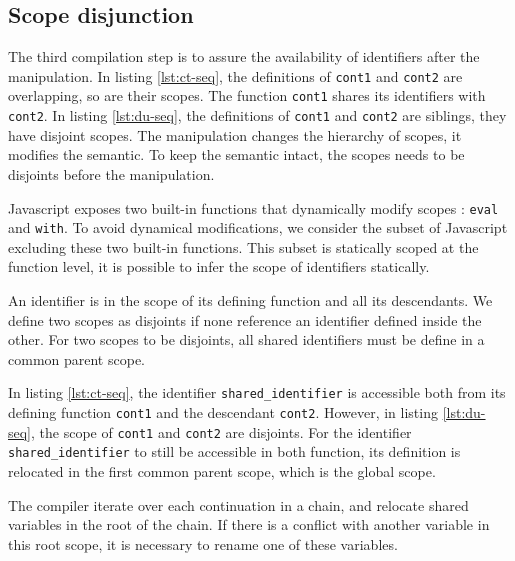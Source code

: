\subsection{Scope disjunction} \label{section:limits:disjunction}

The third compilation step is to assure the availability of identifiers after the manipulation.
In listing \ref{lst:ct-seq}, the definitions of \texttt{cont1} and \texttt{cont2} are overlapping, so are their scopes.
The function \texttt{cont1} shares its identifiers with \texttt{cont2}.
In listing \ref{lst:du-seq}, the definitions of \texttt{cont1} and \texttt{cont2} are siblings, they have disjoint scopes.
The manipulation changes the hierarchy of scopes, it modifies the semantic.
To keep the semantic intact, the scopes needs to be disjoints before the manipulation.

Javascript exposes two built-in functions that dynamically modify scopes : \texttt{eval} and \texttt{with}.
To avoid dynamical modifications, we consider the subset of Javascript excluding these two built-in functions.
This subset is statically scoped at the function level, it is possible to infer the scope of identifiers statically.

An identifier is in the scope of its defining function and all its descendants.
We define two scopes as disjoints if none reference an identifier defined inside the other.
For two scopes to be disjoints, all shared identifiers must be define in a common parent scope.


In listing \ref{lst:ct-seq}, the identifier \texttt{shared\_identifier} is accessible both from its defining function \texttt{cont1} and the descendant \texttt{cont2}.
However, in listing \ref{lst:du-seq}, the scope of \texttt{cont1} and \texttt{cont2} are disjoints.
For the identifier \texttt{shared\_identifier} to still be accessible in both function, its definition is relocated in the first common parent scope, which is the global scope.

The compiler iterate over each continuation in a chain, and  relocate shared variables in the root of the chain.
If there is a conflict with another variable in this root scope, it is necessary to rename one of these variables.


